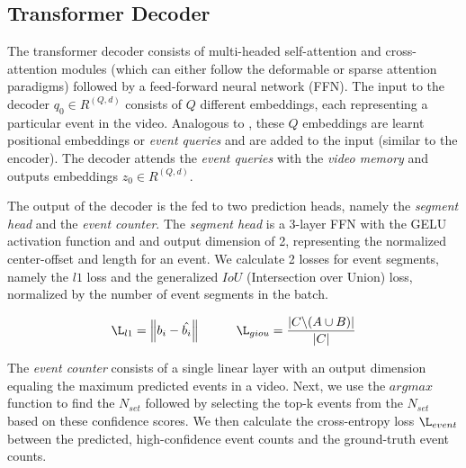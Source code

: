 \subsection{Transformer Decoder}
The transformer decoder consists of multi-headed self-attention and cross-attention modules (which can either follow the deformable or sparse attention paradigms) followed by a feed-forward neural network (FFN). The input to the decoder $q_{0} \in R^{(Q , d)}$ consists of $Q$ different embeddings, each representing a particular event in the video. Analogous to \cite{detr}, these $Q$ embeddings are learnt positional embeddings or \textit{event queries} and are added to the input (similar to the encoder). The decoder attends the \textit{event queries} with the \textit{video memory} and outputs embeddings $z_{0} \in R^{(Q , d)}$.
\par The output of the decoder is the fed to two prediction heads, namely the \textit{segment head} and the \textit{event counter}. The \textit{segment head} is a 3-layer FFN with the GELU activation function and and output dimension of 2, representing the normalized center-offset and length for an event. We calculate 2 losses for event segments, namely the $l1$ loss and the generalized $IoU$ (Intersection over Union) loss, normalized by the number of event segments in the batch.

$$\L_{l1} =  \left \| b_{i} - \hat{b_{i}} \right \| \hspace{1cm} \L_{giou} = \frac{\left |C\symbol{92}(A\cup B)   \right |}{\left | C \right |} $$

\par The \textit{event counter} consists of a single linear layer with an output dimension equaling the maximum predicted events in a video. Next, we use the $argmax$ function to find the $N_{set}$ followed by selecting the top-k events from the $N_{set}$ based on these confidence scores. We then calculate the cross-entropy loss $\L_{event}$ between the predicted, high-confidence event counts and the ground-truth event counts.

